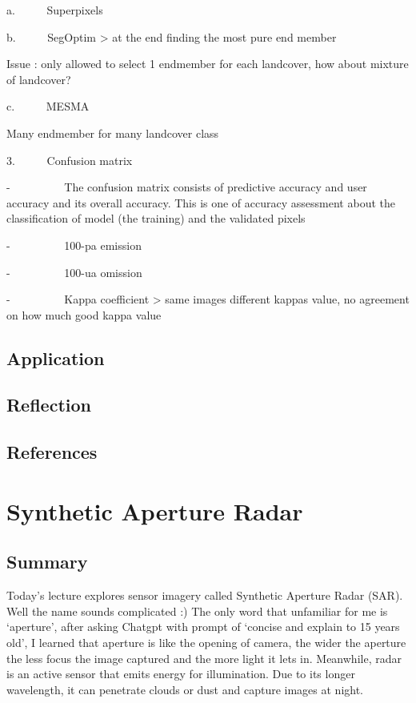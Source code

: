 \documentclass[
  letterpaper,
  DIV=11,
  numbers=noendperiod]{scrreprt}
\begin{document}
a.~~~~~ Superpixels

b.~~~~~ SegOptim \textgreater{} at the end finding the most pure end
member

Issue : only allowed to select 1 endmember for each landcover, how about
mixture of landcover?

c.~~~~~ MESMA

Many endmember for many landcover class

3.~~~~~ Confusion matrix

-~~~~~~~~~ The confusion matrix consists of predictive accuracy and user
accuracy and its overall accuracy. This is one of accuracy assessment
about the classification of model (the training) and the validated
pixels

-~~~~~~~~~ 100-pa emission

-~~~~~~~~~ 100-ua omission

-~~~~~~~~~ Kappa coefficient \textgreater{} same images different kappas
value, no agreement on how much good kappa value

\hypertarget{application-5}{%
\section{Application}\label{application-5}}

\hypertarget{reflection-4}{%
\section{Reflection}\label{reflection-4}}

\hypertarget{references-4}{%
\section{References}\label{references-4}}


\hypertarget{synthetic-aperture-radar}{%
\chapter{Synthetic Aperture Radar}\label{synthetic-aperture-radar}}

\hypertarget{summary-8}{%
\section{Summary}\label{summary-8}}

Today's lecture explores sensor imagery called Synthetic Aperture Radar
(SAR). Well the name sounds complicated :) The only word that unfamiliar
for me is `aperture', after asking Chatgpt with prompt of `concise and
explain to 15 years old', I learned that aperture is like the opening of
camera, the wider the aperture the less focus the image captured and the
more light it lets in. Meanwhile, radar is an active sensor that emits
energy for illumination. Due to its longer wavelength, it can penetrate
clouds or dust and capture images at night.
\end{document}
